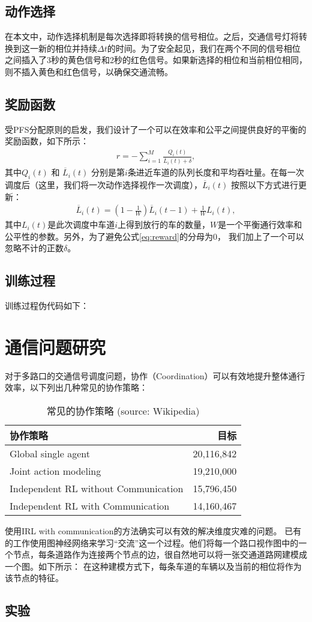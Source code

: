 \subsection*{动作选择}
在本文中，动作选择机制是每次选择即将转换的信号相位。之后，交通信号灯将转换到这一新的相位并持续$\Delta t$的时间。为了安全起见，我们在两个不同的信号相位之间插入了3秒的黄色信号和2秒的红色信号。如果新选择的相位和当前相位相同，则不插入黄色和红色信号，以确保交通流畅。
\subsection*{奖励函数}
受PFS分配原则的启发，我们设计了一个可以在效率和公平之间提供良好的平衡的奖励函数，如下所示：
\begin{align}
\label{eq:reward}
    r = -\sum_{i=1}^{M} \frac{Q_i(t)}{\overline{L}_i(t) + \delta},
\end{align}
其中$Q_i(t)$ 和 $\overline{L}_i(t)$ 分别是第$i$条进近车道的队列长度和平均吞吐量。在每一次调度后（这里，我们将一次动作选择视作一次调度），$\overline{L}_i(t)$ 按照以下方式进行更新：
\begin{align}
    \overline{L}_i(t) = (1-\frac{1}{W})\overline{L}_i(t-1) + \frac{1}{W}L_i(t),
\end{align}
其中$L_i(t)$是此次调度中车道$i$上得到放行的车的数量，$W$是一个平衡通行效率和公平性的参数。另外，为了避免公式\ref{eq:reward}的分母为0， 我们加上了一个可以忽略不计的正数$\delta$。
\subsection*{训练过程}
训练过程伪代码如下：

\section{通信问题研究}
对于多路口的交通信号调度问题，协作（Coordination）可以有效地提升整体通行效率，以下列出几种常见的协作策略：
\begin{table}[htb]
    \caption[协作策略]{常见的协作策略 (source: Wikipedia)\label{tab:coordination}}
    \begin{tabular}{lr}
      \toprule
      协作策略 & 目标\\
      \midrule
      Global single agent & 20,116,842\\
      Joint action modeling & 19,210,000\\
      Independent RL without Communication & 15,796,450\\
      Independent RL with Communication & 14,160,467\\
      \bottomrule
    \end{tabular}
  \end{table}
使用IRL with communication的方法确实可以有效的解决维度灾难的问题。
已有的工作使用图神经网络来学习“交流”这一个过程。他们将每一个路口视作图中的一个节点，每条道路作为连接两个节点的边，很自然地可以将一张交通道路网建模成一个图。如下所示：
在这种建模方式下，每条车道的车辆以及当前的相位将作为该节点的特征。
\subsection{实验}

